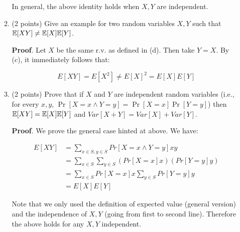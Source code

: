 \documentclass{article}
\begin{document}
\begin{enumerate}
\begin{enumerate}[,label=\alph*.]
In general, the above identity holds when $X,Y$ are independent.
\mdfloatright{\ensuremath{\Box}}%

\item{}
(2 points) Give an example for two random variables $X,Y$ such that $\mathbb{E}[XY] \neq \mathbb{E}[X]\mathbb{E}[Y]$.%

\begin{mdbmarginx}{1ex}{0pt}{1ex}{0pt}%
\noindent{}\textbf{Proof}.  Let $X$ be the same r.v. as defined in (d). Then take $Y = X$. By (c), it immediately follows that:%
\end{mdbmarginx}%
\noindent\noindent\[%
E[XY] = E[X^2] \neq E[X]^2 = E[X]E[Y]
\]%

\mdfloatright{\ensuremath{\Box}}%

\item{}
(2 points) Prove that if $X$ and $Y$ are independent random variables (i.e., for every $x,y$,
$\Pr[X=x \wedge Y=y]=\Pr[X=x]\Pr[Y=y]$) then
$\mathbb{E}[XY]=\mathbb{E}[X]\mathbb{E}[Y]$ and $Var[X+Y]=Var[X]+Var[Y]$.%

\begin{mdbmarginx}{1ex}{0pt}{1ex}{0pt}%
\noindent{}\textbf{Proof}.  We prove the general case hinted at above. We have:%
\end{mdbmarginx}%
\noindent\noindent\[%
\begin{aligned}
E[XY] &= \sum_{x \in S, y \in S} Pr[X = x \wedge Y = y]xy \\
& = \sum_{x \in S} \sum_{y \in S} (Pr[X = x]x) (Pr[Y= y]y) \\
&= \sum_{x \in S} Pr[X = x]x \sum_{y \in S} Pr[Y = y]y \\
&= E[X]E[Y] 
\end{aligned}
\]%

Note that we only used the definition of expected value (general version) and the independence of 
$X,Y$ (going from first to second line). Therefore the above holds for any $X,Y$ independent. 
\mdfloatright{\ensuremath{\Box}}%
\end{enumerate}%


\end{enumerate}
\end{document}
